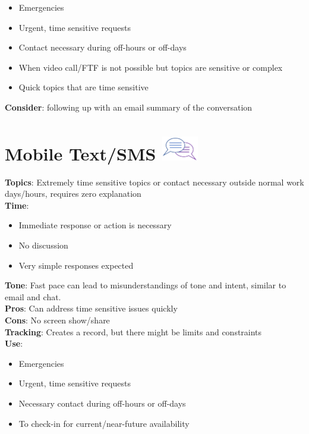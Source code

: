 \documentclass[
  letterpaper,
  DIV=11,
  numbers=noendperiod]{scrreprt}
\providecommand{\tightlist}{%
  \setlength{\itemsep}{0pt}\setlength{\parskip}{0pt}}\usepackage{longtable,booktabs,array}
\begin{document}
\begin{itemize}
\tightlist
\item
  Emergencies\\
\item
  Urgent, time sensitive requests\\
\item
  Contact necessary during off-hours or off-days\\
\item
  When video call/FTF is not possible but topics are sensitive or
  complex\\
\item
  Quick topics that are time sensitive
\end{itemize}

\textbf{Consider}: following up with an email summary of the
conversation

\section[Mobile Text/SMS ]{\texorpdfstring{Mobile Text/SMS
\protect\includegraphics[width=\textwidth,height=0.41667in]{_img/communication_icon.png}}{Mobile Text/SMS }}\label{mobile-textsms}

\textbf{Topics}: Extremely time sensitive topics or contact necessary
outside normal work days/hours, requires zero explanation\\
\textbf{Time}:

\begin{itemize}
\tightlist
\item
  Immediate response or action is necessary
\item
  No discussion
\item
  Very simple responses expected
\end{itemize}

\textbf{Tone}: Fast pace can lead to misunderstandings of tone and
intent, similar to email and chat.\\
\textbf{Pros}: Can address time sensitive issues quickly\\
\textbf{Cons}: No screen show/share\\
\textbf{Tracking}: Creates a record, but there might be limits and
constraints\\
\textbf{Use}:

\begin{itemize}
\tightlist
\item
  Emergencies\\
\item
  Urgent, time sensitive requests\\
\item
  Necessary contact during off-hours or off-days\\
\item
  To check-in for current/near-future availability
\end{itemize}
\end{document}
